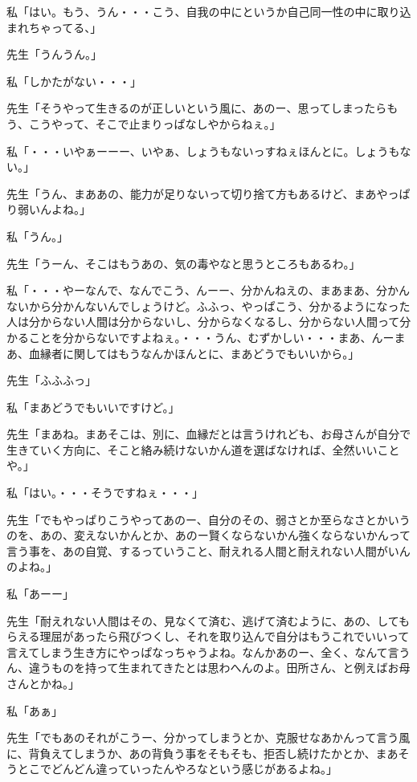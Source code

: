 \documentclass[b5j,twoside,twocolumn]{utarticle}
\begin{document}
\begin{description}
\item 私「はい。もう、うん・・・こう、自我の中にというか自己同一性の中に取り込まれちゃってる、」
\item 先生「うんうん。」
\item 私「しかたがない・・・」
\item 先生「そうやって生きるのが正しいという風に、あのー、思ってしまったらもう、こうやって、そこで止まりっぱなしやからねぇ。」
\item 私「・・・いやぁーーー、いやぁ、しょうもないっすねぇほんとに。しょうもない。」
\item 先生「うん、まああの、能力が足りないって切り捨て方もあるけど、まあやっぱり弱いんよね。」
\item 私「うん。」
\item 先生「うーん、そこはもうあの、気の毒やなと思うところもあるわ。」
\item 私「・・・やーなんで、なんでこう、んーー、分かんねえの、まあまあ、分かんないから分かんないんでしょうけど。ふふっ、やっぱこう、分かるようになった人は分からない人間は分からないし、分からなくなるし、分からない人間って分かることを分からないですよねぇ。・・・うん、むずかしい・・・まあ、んーまあ、血縁者に関してはもうなんかほんとに、まあどうでもいいから。」
\item 先生「ふふふっ」
\item 私「まあどうでもいいですけど。」
\item 先生「まあね。まあそこは、別に、血縁だとは言うけれども、お母さんが自分で生きていく方向に、そこと絡み続けないかん道を選ばなければ、全然いいことや。」
\item 私「はい。・・・そうですねぇ・・・」
\item 先生「でもやっぱりこうやってあのー、自分のその、弱さとか至らなさとかいうのを、あの、変えないかんとか、あのー賢くならないかん強くならないかんって言う事を、あの自覚、するっていうこと、耐えれる人間と耐えれない人間がいんのよね。」
\item 私「あーー」
\item 先生「耐えれない人間はその、見なくて済む、逃げて済むように、あの、してもらえる理屈があったら飛びつくし、それを取り込んで自分はもうこれでいいって言えてしまう生き方にやっぱなっちゃうよね。なんかあのー、全く、なんて言うん、違うものを持って生まれてきたとは思わへんのよ。田所さん、と例えばお母さんとかね。」
\item 私「あぁ」
\item 先生「でもあのそれがこうー、分かってしまうとか、克服せなあかんって言う風に、背負えてしまうか、あの背負う事をそもそも、拒否し続けたかとか、まあそうとこでどんどん違っていったんやろなという感じがあるよね。」

\end{description}
\end{document}
